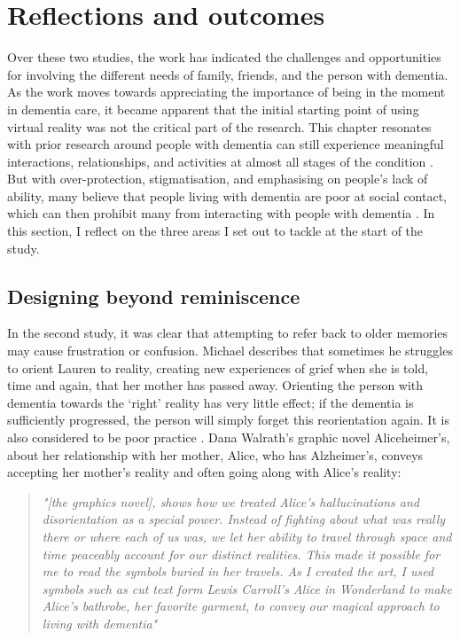 \section{Reflections and outcomes}
\label{S2:Reflection}
Over these two studies, the work has indicated the challenges and opportunities for involving the different needs of family, friends, and the person with dementia. As the work moves towards appreciating the importance of being in the moment in dementia care, it became apparent that the initial starting point of using virtual reality was not the critical part of the research. This chapter resonates with prior research around people with dementia can still experience meaningful interactions, relationships, and activities at almost all stages of the condition \citep{kitwood1997dementia}. But with over-protection, stigmatisation, and emphasising on people’s lack of ability, many believe that people living with dementia are poor at social contact, which can then prohibit many from interacting with people with dementia \citep{christine_bryden_dancing_2005, riley_anxiety_2014}. In this section, I reflect on the three areas I set out to tackle at the start of the study.

\subsection{Designing beyond reminiscence}
\label{beyond-reminiscence}
In the second study, it was clear that attempting to refer back to older memories may cause frustration or confusion. Michael describes that sometimes he struggles to orient Lauren to reality, creating new experiences of grief when she is told, time and again, that her mother has passed away. Orienting the person with dementia towards the `right' reality has very little effect; if the dementia is sufficiently progressed, the person will simply forget this reorientation again. It is also considered to be poor practice \citep{cipriani_understanding_2014}. Dana Walrath's graphic novel Aliceheimer's, about her relationship with her mother, Alice, who has Alzheimer's, conveys accepting her mother's reality and often going along with Alice's reality:

\begin{quote}
\textit{"[the graphics novel], shows how we treated Alice's hallucinations and disorientation as a special power. Instead of fighting about what was really there or where each of us was, we let her ability to travel through space and time peaceably account for our distinct realities. This made it possible for me to read the symbols buried in her travels. As I created the art, I used symbols such as cut text form Lewis Carroll's Alice in Wonderland to make Alice's bathrobe, her favorite garment, to convey our magical approach to living with dementia" \citep{walrath2021aliceheimer,walrath2017end}}
\end{quote}

